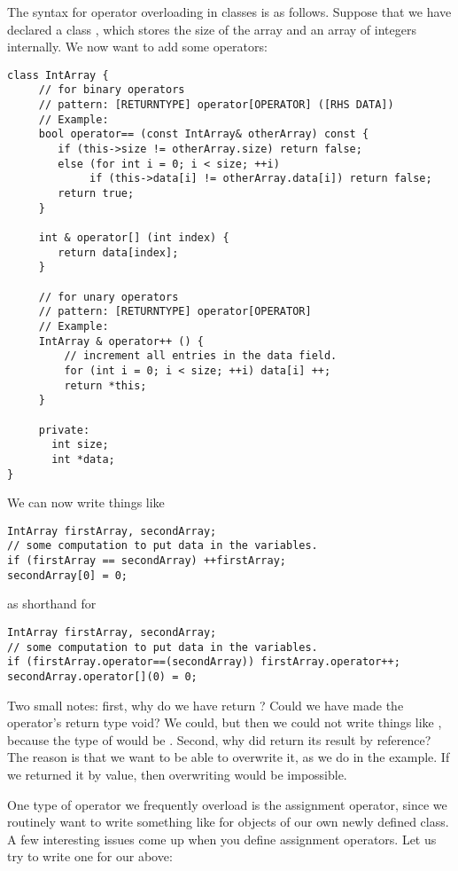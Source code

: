 The syntax for operator overloading in classes is as follows.
Suppose that we have declared a class ,
which stores the size of the array and an array of integers internally.
We now want to add some operators:
\begin{verbatim}
class IntArray {
     // for binary operators
     // pattern: [RETURNTYPE] operator[OPERATOR] ([RHS DATA])
     // Example:
     bool operator== (const IntArray& otherArray) const {         
        if (this->size != otherArray.size) return false;
        else (for int i = 0; i < size; ++i)
             if (this->data[i] != otherArray.data[i]) return false;
        return true;
     }

     int & operator[] (int index) {
        return data[index];
     }

     // for unary operators
     // pattern: [RETURNTYPE] operator[OPERATOR]
     // Example:
     IntArray & operator++ () {
         // increment all entries in the data field.
         for (int i = 0; i < size; ++i) data[i] ++;
         return *this;
     }

     private:
       int size;
       int *data;
}
\end{verbatim}

We can now write things like
\begin{verbatim}
IntArray firstArray, secondArray;
// some computation to put data in the variables.
if (firstArray == secondArray) ++firstArray;
secondArray[0] = 0;
\end{verbatim}
as shorthand for
\begin{verbatim}
IntArray firstArray, secondArray;
// some computation to put data in the variables.
if (firstArray.operator==(secondArray)) firstArray.operator++;
secondArray.operator[](0) = 0;
\end{verbatim}

Two small notes: first, why do we have \code{++} return ?
Could we have made the operator's return type void?
We could, but then we could not write things like ,
because the type of  would be .
Second, why did  return its result by reference?
The reason is that we want to be able to overwrite it,
as we do in the example.
If we returned it by value, then overwriting would be impossible.

One type of operator we frequently overload is the assignment operator,
since we routinely want to write something like  for objects
of our own newly defined class.
A few interesting issues come up when you define assignment operators.
Let us try to write one for our  above:

